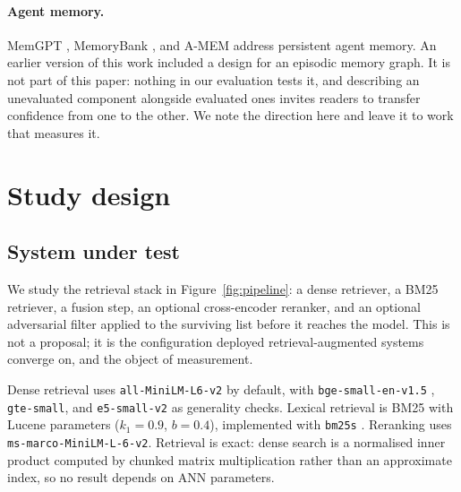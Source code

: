 \documentclass{article}
\begin{document}
\paragraph{Agent memory.} MemGPT \citep{packer2023memgpt}, MemoryBank
\citep{zhong2023memorybank}, and A-MEM \citep{xu2025amem} address persistent
agent memory. An earlier version of this work included a design for an episodic
memory graph. It is not part of this paper: nothing in our evaluation tests it,
and describing an unevaluated component alongside evaluated ones invites readers
to transfer confidence from one to the other. We note the direction here and
leave it to work that measures it.

\section{Study design}
\label{sec:protocol}

\subsection{System under test}

We study the retrieval stack in Figure~\ref{fig:pipeline}: a dense retriever, a
BM25 retriever, a fusion step, an optional cross-encoder reranker, and an
optional adversarial filter applied to the surviving list before it reaches the
model. This is not a proposal; it is the configuration deployed
retrieval-augmented systems converge on, and the object of measurement.

Dense retrieval uses \texttt{all-MiniLM-L6-v2} \citep{reimers2019sbert} by
default, with \texttt{bge-small-en-v1.5} \citep{xiao2023bge}, \texttt{gte-small},
and \texttt{e5-small-v2} \citep{wang2022e5} as generality checks. Lexical retrieval is BM25 with Lucene parameters
($k_1{=}0.9$, $b{=}0.4$), implemented with \texttt{bm25s} \citep{lu2024bm25s}.
Reranking uses \texttt{ms-marco-MiniLM-L-6-v2}. Retrieval is exact: dense search
is a normalised inner product computed by chunked matrix multiplication rather
than an approximate index, so no result depends on ANN parameters.
\end{document}
